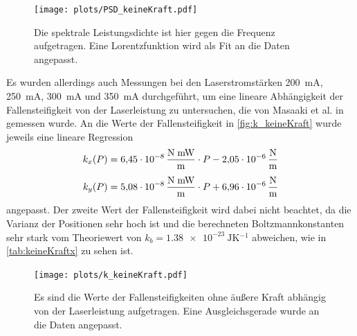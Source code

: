     \begin{figure}[ht]
        \centering\captionsetup{format=plain}
        \texttt{[image: plots/PSD\_keineKraft.pdf]} \vspace*{-0.5cm}
        \caption{Die spektrale Leistungsdichte ist hier gegen die Frequenz aufgetragen. Eine Lorentzfunktion wird als Fit an die Daten angepasst.}
        \label{fig:PSD_keineKraft}
    \end{figure}
    Es wurden allerdings auch Messungen bei den Laserstromstärken \qty{200}{mA}, \qty{250}{mA}, \qty{300}{mA} und \qty{350}{mA} durchgeführt, um eine lineare Abhängigkeit der Fallensteifigkeit von der Laserleistung zu untersuchen, die von Masaaki et al. in \cite{measurement_of_optical_trapping_force_gradient} gemessen wurde.
    An die Werte der Fallensteifigkeit in \autoref{fig:k_keineKraft} wurde jeweils eine lineare Regression
    \begin{equation}    
        \begin{aligned}
            k_x(P) &= \qty{6.45e-8}{\frac{\newton \; mW}{\metre}} \cdot P - \qty{2.05e-6}{\newton\per\metre} \\[4pt]
            k_y(P) &= \qty{5.08e-8}{\frac{\newton \; mW}{\metre}} \cdot P + \qty{6.96e-6}{\newton\per\metre}
        \end{aligned}
        \label{eqn:k_kalibrierung}
    \end{equation}
    angepasst.
    Der zweite Wert der Fallensteifigkeit wird dabei nicht beachtet, da die Varianz der Positionen sehr hoch ist und die berechneten Boltzmannkonstanten sehr stark vom Theoriewert von $k_b = \qty{1,38e-23}{\joule \kelvin^{-1}}$ abweichen, wie in \autoref{tab:keineKraftx} zu sehen ist.
    \begin{figure}[ht]
        \centering\captionsetup{format=plain}
        \texttt{[image: plots/k\_keineKraft.pdf]} \vspace*{-0.5cm}
        \caption{Es sind die Werte der Fallensteifigkeiten ohne äußere Kraft abhängig von der Laserleistung aufgetragen. Eine Ausgleichsgerade wurde an die Daten angepasst.}
        \label{fig:k_keineKraft}
    \end{figure}
    \FloatBarrier
